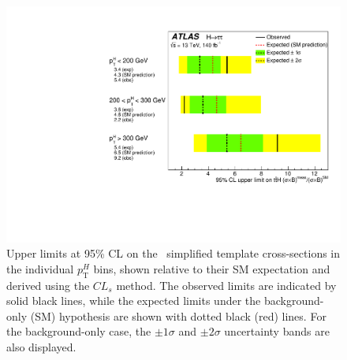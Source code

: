 \begin{figure}[htbp]
  \centering
  \includegraphics[width=0.70\linewidth]{images/fit_stxs/fig_08.pdf} %
  \caption{Upper limits at 95\% CL on the \ttH\ simplified template cross-sections in the individual $p_{\mathrm{T}}^{H}$ bins, shown relative to their SM expectation and derived using the $CL_s$ method. The observed limits are indicated by solid black lines, while the expected limits under the background-only (SM) hypothesis are shown with dotted black (red) lines. For the background-only case, the $\pm 1\sigma$ and $\pm 2\sigma$ uncertainty bands are also displayed.}
  \label{fig:tth_cls_limits}
\end{figure}








